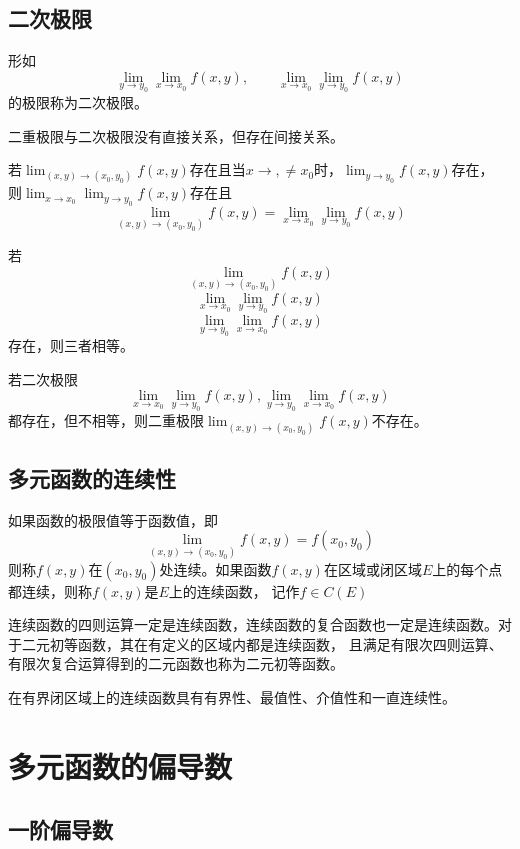 \subsection{二次极限}
形如
\[ \lim_{y\to y_0} \lim_{x\to x_0}f(x,y),\qquad \lim_{x\to x_0}\lim_{y\to y_0}f(x,y) \]
的极限称为二次极限。

二重极限与二次极限没有直接关系，但存在间接关系。
\begin{theorem}
    若$\lim_{(x,y)\to(x_0,y_0)}f(x,y)$存在且当$x\to,\neq x_0$时，$\lim_{y\to y_0}f(x,y)$存在，
    则$\lim_{x\to x_0} \lim_{y\to y_0}f(x,y)$存在且
    \[ \lim_{(x,y)\to(x_0,y_0)}f(x,y) = \lim_{x\to x_0} \lim_{y\to y_0}f(x,y) \]
\end{theorem}

\begin{theorem}
    若
    \[\lim_{(x,y)\to(x_0,y_0)}f(x,y)\]
    \[\lim_{x\to x_0} \lim_{y\to y_0}f(x,y)\]
    \[\lim_{y\to y_0}\lim_{x\to x_0}f(x,y)\]
    存在，则三者相等。
\end{theorem}

\begin{theorem}
    若二次极限
    \[ \lim_{x\to x_0} \lim_{y\to y_0}f(x,y),\lim_{y\to y_0}\lim_{x\to x_0}f(x,y) \]
    都存在，但不相等，则二重极限$\lim_{(x,y)\to(x_0,y_0)}f(x,y)$不存在。
\end{theorem}

\subsection{多元函数的连续性}
如果函数的极限值等于函数值，即
\[ \lim_{(x,y)\to(x_0,y_0)} f(x,y) = f(x_0,y_0) \]
则称$f(x,y)$在$(x_0,y_0)$处连续。如果函数$f(x,y)$在区域或闭区域$E$上的每个点都连续，则称$f(x,y)$是$E$上的连续函数，
记作$f\in C(E)$

连续函数的四则运算一定是连续函数，连续函数的复合函数也一定是连续函数。对于二元初等函数，其在有定义的区域内都是连续函数，
且满足有限次四则运算、有限次复合运算得到的二元函数也称为二元初等函数。

在有界闭区域上的连续函数具有有界性、最值性、介值性和一直连续性。

\section{多元函数的偏导数}
\subsection{一阶偏导数}
